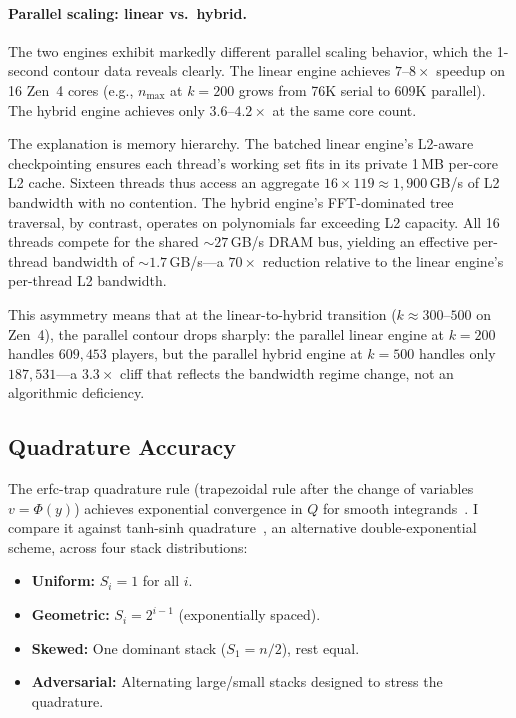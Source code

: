 \documentclass[11pt]{article}
\begin{document}
\paragraph{Parallel scaling: linear vs.\ hybrid.}
The two engines exhibit markedly different parallel scaling behavior, which
the 1-second contour data reveals clearly.  The linear engine achieves
$7$--$8\times$ speedup on 16 Zen~4 cores (e.g., $n_{\max}$ at $k = 200$
grows from 76K serial to 609K parallel).  The hybrid engine achieves only
$3.6$--$4.2\times$ at the same core count.

The explanation is memory hierarchy.  The batched linear engine's
L2-aware checkpointing ensures each thread's working set fits in its
private 1\,MB per-core L2 cache.  Sixteen threads thus access an aggregate
$16 \times 119 \approx 1{,}900$\,GB/s of L2 bandwidth with no contention.
The hybrid engine's FFT-dominated tree traversal, by contrast, operates on
polynomials far exceeding L2 capacity.  All 16 threads compete for the
shared ${\sim}27$\,GB/s DRAM bus, yielding an effective per-thread
bandwidth of ${\sim}1.7$\,GB/s---a $70\times$ reduction relative to the
linear engine's per-thread L2 bandwidth.

This asymmetry means that at the linear-to-hybrid transition ($k \approx
300$--$500$ on Zen~4), the parallel contour drops sharply: the parallel
linear engine at $k = 200$ handles $609{,}453$ players, but the parallel
hybrid engine at $k = 500$ handles only $187{,}531$---a $3.3\times$ cliff
that reflects the bandwidth regime change, not an algorithmic deficiency.

\subsection{Quadrature Accuracy}\label{sec:accuracy}

The erfc-trap quadrature rule (trapezoidal rule after the change of
variables $v = \Phi(y)$) achieves exponential convergence in $Q$ for
smooth integrands~\citep{trefethen2014}. I compare it against tanh-sinh
quadrature~\citep{mori2001}, an alternative double-exponential scheme,
across four stack distributions:

\begin{itemize}
  \item \textbf{Uniform:} $S_i = 1$ for all $i$.
  \item \textbf{Geometric:} $S_i = 2^{i-1}$ (exponentially spaced).
  \item \textbf{Skewed:} One dominant stack ($S_1 = n/2$), rest equal.
  \item \textbf{Adversarial:} Alternating large/small stacks designed to
    stress the quadrature.
\end{itemize}
\end{document}
